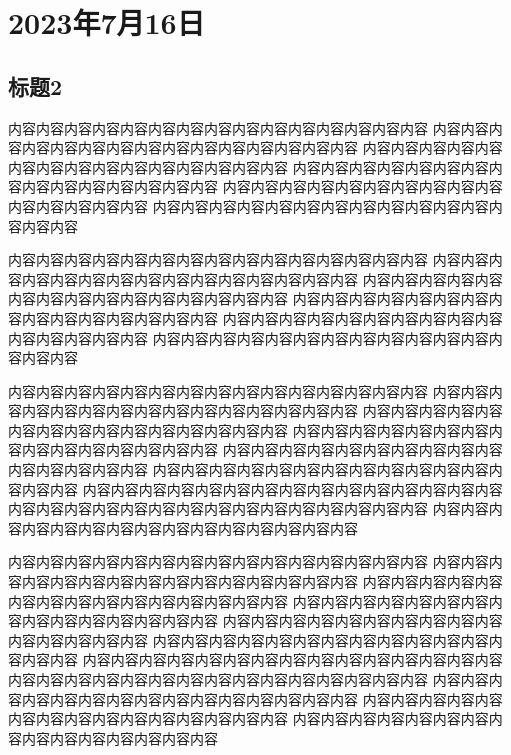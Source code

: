 \chapter*{2023年7月16日}
\section*{标题2}
\label{section:B}
内容内容内容内容内容内容内容内容内容内容内容内容内容内容内容
内容内容内容内容内容内容内容内容内容内容内容内容内容内容内容
内容内容内容内容内容内容内容内容内容内容内容内容内容内容内容
内容内容内容内容内容内容内容内容内容内容内容内容内容内容内容
内容内容内容内容内容内容内容内容内容内容内容内容内容内容内容
内容内容内容内容内容内容内容内容内容内容内容内容内容内容内容

内容内容内容内容内容内容内容内容内容内容内容内容内容内容内容
内容内容内容内容内容内容内容内容内容内容内容内容内容内容内容
内容内容内容内容内容内容内容内容内容内容内容内容内容内容内容
内容内容内容内容内容内容内容内容内容内容内容内容内容内容内容
内容内容内容内容内容内容内容内容内容内容内容内容内容内容内容
内容内容内容内容内容内容内容内容内容内容内容内容内容内容内容

内容内容内容内容内容内容内容内容内容内容内容内容内容内容内容
内容内容内容内容内容内容内容内容内容内容内容内容内容内容内容
内容内容内容内容内容内容内容内容内容内容内容内容内容内容内容
内容内容内容内容内容内容内容内容内容内容内容内容内容内容内容
内容内容内容内容内容内容内容内容内容内容内容内容内容内容内容
内容内容内容内容内容内容内容内容内容内容内容内容内容内容内容
内容内容内容内容内容内容内容内容内容内容内容内容内容内容内容
内容内容内容内容内容内容内容内容内容内容内容内容内容内容内容
内容内容内容内容内容内容内容内容内容内容内容内容内容内容内容

内容内容内容内容内容内容内容内容内容内容内容内容内容内容内容
内容内容内容内容内容内容内容内容内容内容内容内容内容内容内容
内容内容内容内容内容内容内容内容内容内容内容内容内容内容内容
内容内容内容内容内容内容内容内容内容内容内容内容内容内容内容
内容内容内容内容内容内容内容内容内容内容内容内容内容内容内容
内容内容内容内容内容内容内容内容内容内容内容内容内容内容内容
内容内容内容内容内容内容内容内容内容内容内容内容内容内容内容
内容内容内容内容内容内容内容内容内容内容内容内容内容内容内容
内容内容内容内容内容内容内容内容内容内容内容内容内容内容内容
内容内容内容内容内容内容内容内容内容内容内容内容内容内容内容
内容内容内容内容内容内容内容内容内容内容内容内容内容内容内容